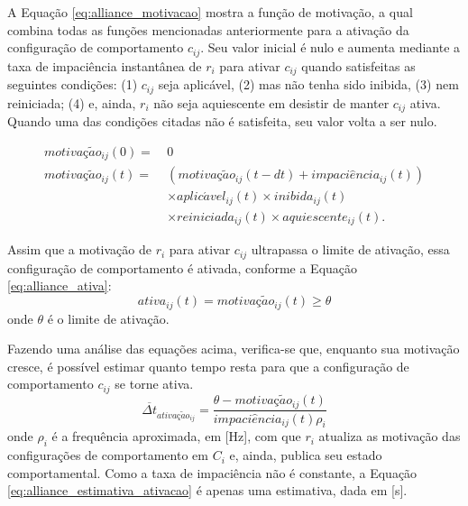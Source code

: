     A Equação \ref{eq:alliance_motivacao} mostra a função de motivação, a qual combina todas as funções mencionadas anteriormente para a ativação da configuração de comportamento $c_{ij}$. Seu valor inicial é nulo e aumenta mediante a taxa de impaciência instantânea de $r_i$ para ativar $c_{ij}$ quando satisfeitas as seguintes condições: (1) $c_{ij}$ seja aplicável, (2) mas não tenha sido inibida, (3) nem reiniciada; (4) e, ainda, $r_i$ não seja aquiescente em desistir de manter $c_{ij}$ ativa. Quando uma das condições citadas não é satisfeita, seu valor volta a ser nulo. 
    
    \begin{equation} \label{eq:alliance_motivacao}
        \begin{aligned}
            motiva\textit{ç}\tilde{a}o_{ij}(0) = \ & 0 \\
            motiva\textit{ç}\tilde{a}o_{ij}(t) = \ & (motiva\textit{ç}\tilde{a}o_{ij}(t - dt) + impaci\hat{e}ncia_{ij}(t)) \\
            & \times aplic\acute{a}vel_{ij}(t) \times inibida_{ij}(t) \\
            & \times reiniciada_{ij}(t) \times aquiescente_{ij}(t).
        \end{aligned}
    \end{equation}
    
    Assim que a motivação de $r_i$ para ativar $c_{ij}$ ultrapassa o limite de ativação, essa configuração de comportamento é ativada, conforme a Equação \ref{eq:alliance_ativa}:
    \begin{equation} \label{eq:alliance_ativa}
        ativa_{ij}(t) = motiva\textit{ç}\tilde{a}o_{ij}(t) \geq \theta
    \end{equation}
    onde $\theta$ é o limite de ativação.
    
    Fazendo uma análise das equações acima, verifica-se que, enquanto sua motivação cresce, é possível estimar quanto tempo resta para que a configuração de comportamento $c_{ij}$ se torne ativa. 
    \begin{equation} \label{eq:alliance_estimativa_ativacao}
        \overline{\Delta t}_{ativa\textit{ç}\tilde{a}o_{ij}} = \frac{\theta - motiva\textit{ç}\tilde{a}o_{ij}(t)}{impaci\hat{e}ncia_{ij}(t) \rho_i}
    \end{equation}
    onde $\rho_i$ é a frequência aproximada, em [\si{\hertz}], com que $r_i$ atualiza as motivação das configurações de comportamento em $C_i$ e, ainda, publica seu estado comportamental. Como a taxa de impaciência não é constante, a Equação \ref{eq:alliance_estimativa_ativacao} é apenas uma estimativa, dada em [\si{\second}].
    
